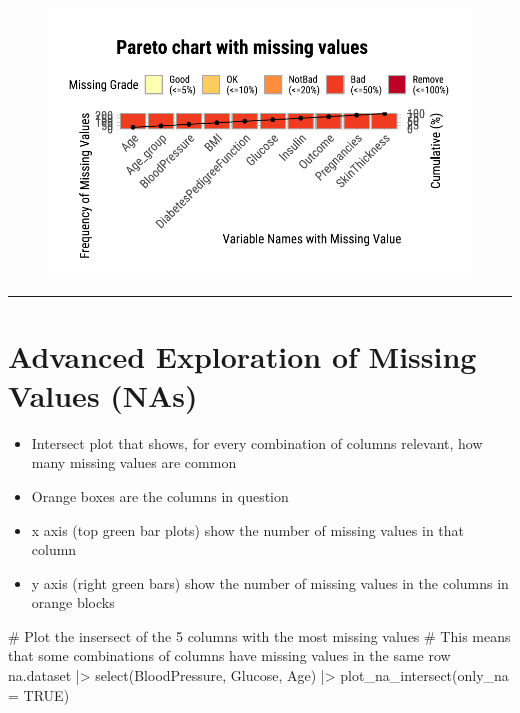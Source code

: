 \documentclass[
  letterpaper,
  DIV=11,
  numbers=noendperiod]{scrreprt}
\newenvironment{Shaded}{\begin{snugshade}}{\end{snugshade}}
\newcommand{\AttributeTok}[1]{\textcolor[rgb]{0.40,0.45,0.13}{#1}}
\newcommand{\CommentTok}[1]{\textcolor[rgb]{0.37,0.37,0.37}{#1}}
\newcommand{\ConstantTok}[1]{\textcolor[rgb]{0.56,0.35,0.01}{#1}}
\newcommand{\FunctionTok}[1]{\textcolor[rgb]{0.28,0.35,0.67}{#1}}
\newcommand{\NormalTok}[1]{\textcolor[rgb]{0.00,0.23,0.31}{#1}}
\newcommand{\SpecialCharTok}[1]{\textcolor[rgb]{0.37,0.37,0.37}{#1}}
\providecommand{\tightlist}{%
  \setlength{\itemsep}{0pt}\setlength{\parskip}{0pt}}\usepackage{longtable,booktabs,array}
\begin{document}
\begin{figure}[H]

{\centering \includegraphics{./ImputatingLikeDataScientist_files/figure-pdf/unnamed-chunk-7-1.pdf}

}

\end{figure}

\begin{center}\rule{0.5\linewidth}{0.5pt}\end{center}

\hypertarget{advanced-exploration-of-missing-values-nas}{%
\section{Advanced Exploration of Missing Values
(NAs)}\label{advanced-exploration-of-missing-values-nas}}

\begin{itemize}
\tightlist
\item
  Intersect plot that shows, for every combination of columns relevant,
  how many missing values are common
\item
  Orange boxes are the columns in question
\item
  x axis (top green bar plots) show the number of missing values in that
  column
\item
  y axis (right green bars) show the number of missing values in the
  columns in orange blocks
\end{itemize}

\begin{Shaded}
\begin{Highlighting}[]
\CommentTok{\# Plot the insersect of the 5 columns with the most missing values}
\CommentTok{\# This means that some combinations of columns have missing values in the same row}
\NormalTok{na.dataset }\SpecialCharTok{|\textgreater{}}
  \FunctionTok{select}\NormalTok{(BloodPressure, Glucose, Age) }\SpecialCharTok{|\textgreater{}}
  \FunctionTok{plot\_na\_intersect}\NormalTok{(}\AttributeTok{only\_na =} \ConstantTok{TRUE}\NormalTok{) }
\end{Highlighting}
\end{Shaded}
\end{document}
